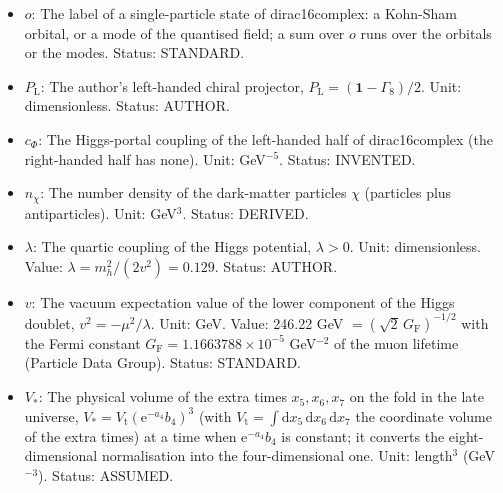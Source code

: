 \documentclass[
  10pt,
]{article}
\begin{document}
\begin{itemize}
  rest on the static block: a 16-component spinor function of
  \(\sigma\); the orbital of each particle is
  \(\mathrm{e}^{3H\lvert\sigma\rvert}\chi_o(\sigma)\mathrm{e}^{-\mathrm{i}\omega x_4}\)
  divided by the square root of the volume of ordinary space and of
  \(V_*\); normalised to the Krein charge \(-1\),
  \(\int\mathrm{d}\sigma\,\chi_o^\dagger\mathfrak{B}\chi_o = -1\);
  \(\bar\chi_o = \chi_o^\dagger\sigma_{16}\) is its Dirac adjoint. Unit:
  GeV\(^{1/2}\). Status: DERIVED.
\item
  \(o\): The label of a single-particle state of dirac16complex: a
  Kohn-Sham orbital, or a mode of the quantised field; a sum over \(o\)
  runs over the orbitals or the modes. Status: STANDARD.
\item
  \(P_{\mathrm{L}}\): The author's left-handed chiral projector,
  \(P_{\mathrm{L}} = (\mathbf{1} - \Gamma_8)/2\). Unit: dimensionless.
  Status: AUTHOR.
\item
  \(c_\Phi\): The Higgs-portal coupling of the left-handed half of
  dirac16complex (the right-handed half has none). Unit: GeV\(^{-5}\).
  Status: INVENTED.
\item
  \(n_\chi\): The number density of the dark-matter particles \(\chi\)
  (particles plus antiparticles). Unit: GeV\(^3\). Status: DERIVED.
\item
  \(\lambda\): The quartic coupling of the Higgs potential,
  \(\lambda > 0\). Unit: dimensionless. Value:
  \(\lambda = m_h^2/(2v^2) = 0.129\). Status: AUTHOR.
\item
  \(v\): The vacuum expectation value of the lower component of the
  Higgs doublet, \(v^2 = -\mu^2/\lambda\). Unit: GeV. Value: 246.22 GeV
  \(= (\sqrt2\,G_{\mathrm{F}})^{-1/2}\) with the Fermi constant
  \(G_{\mathrm{F}} = 1.1663788\times10^{-5}\) GeV\(^{-2}\) of the muon
  lifetime (Particle Data Group). Status: STANDARD.
\item
  \(V_*\): The physical volume of the extra times \(x_5, x_6, x_7\) on
  the fold in the late universe,
  \(V_* = V_{\mathrm{t}}(\mathrm{e}^{-a_4}b_4)^3\) (with
  \(V_{\mathrm{t}} = \int\mathrm{d}x_5\,\mathrm{d}x_6\,\mathrm{d}x_7\)
  the coordinate volume of the extra times) at a time when
  \(\mathrm{e}^{-a_4}b_4\) is constant; it converts the
  eight-dimensional normalisation into the four-dimensional one. Unit:
  length\(^3\) (GeV\(^{-3}\)). Status: ASSUMED.
\end{itemize}
\end{document}

